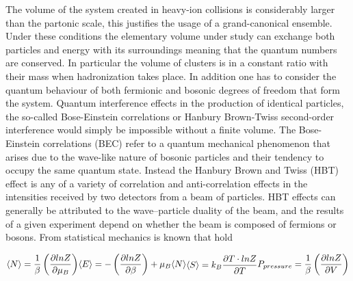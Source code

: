 \documentclass[12pt,a4paper]{book}
\begin{document}
	The volume of the system created in	heavy-ion collisions is considerably larger than the partonic scale, this justifies the usage of a grand-canonical ensemble. Under these conditions the elementary volume under study can exchange both particles and energy with its surroundings meaning that the quantum numbers are conserved. In particular the volume of clusters is in a constant ratio with their mass when hadronization takes place.  In addition one has to consider the quantum behaviour of both fermionic and bosonic degrees of freedom that form the system. Quantum interference effects in the production of identical particles, the so-called Bose-Einstein correlations or Hanbury Brown-Twiss second-order interference would simply be impossible without a finite volume. The Bose-Einstein correlations (BEC) refer to a quantum mechanical phenomenon that arises due to the wave-like nature of bosonic particles and their tendency to occupy the same quantum state. Instead the Hanbury Brown and Twiss (HBT) effect is any of a variety of correlation and anti-correlation effects in the intensities received by two detectors from a beam of particles. HBT effects can generally be attributed to the wave–particle duality of the beam, and the results of a given experiment depend on whether the beam is composed of fermions or bosons. From statistical mechanics is known that hold
	
	\begin{equation}
		\begin{subequations}
			\begin{align}
			\langle N \rangle = \frac{1}{\beta} \left( \frac{\partial lnZ}{\partial \mu_B}\right) \\
		\end{align}
	\end{subequations}
	\begin{subequations}
	\begin{align}
				\langle E \rangle = - \left( \frac{\partial lnZ}{\partial \beta}\right) + \mu_B \langle N \rangle \\
	\end{align}
	\end{subequations}
	\begin{subequations}
		\begin{align}
		\langle S \rangle = k_B \frac{\partial T \cdot lnZ}{\partial T} \\
		\end{align}
	\end{subequations}
	\begin{subequations}
		\begin{align}
	P_{pressure} = \frac{1}{\beta} \left( \frac{\partial lnZ}{\partial V}\right) \\
		\end{align}
	\end{subequations}
	\end{equation}
	
\end{document}
